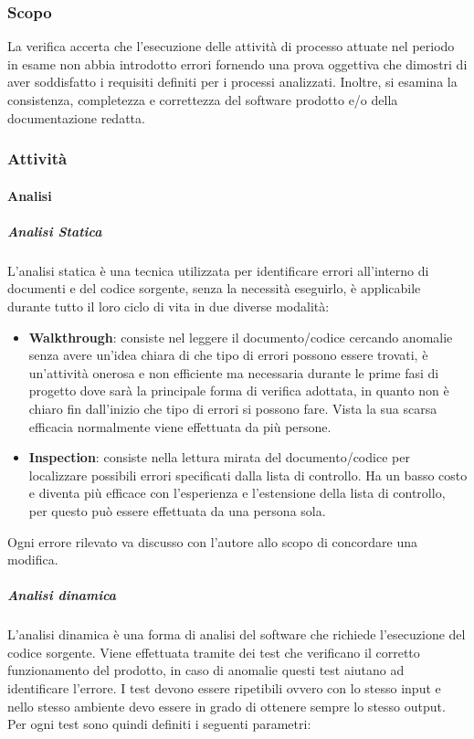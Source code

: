 \subsubsection{Scopo}
La verifica accerta che l'esecuzione delle attività di processo attuate nel periodo in esame non abbia introdotto errori fornendo una prova oggettiva che dimostri di aver soddisfatto i requisiti definiti per i processi analizzati.
Inoltre, si esamina la consistenza, completezza e correttezza del software prodotto e/o della documentazione redatta.
\subsubsection{Attività}
\paragraph{Analisi}
\subparagraph{Analisi Statica} \Spazio
L'analisi statica è una tecnica utilizzata per identificare errori all'interno di documenti e del codice sorgente, senza la necessità eseguirlo, è applicabile durante tutto il loro ciclo di vita in due diverse modalità:
\begin{itemize}
	\item \textbf{Walkthrough}:
	      consiste nel leggere il documento/codice cercando anomalie senza avere un'idea chiara di che tipo di errori possono essere trovati, è un'attività onerosa e non efficiente ma necessaria durante le prime fasi di progetto dove sarà la principale forma di verifica adottata, in quanto non è chiaro fin dall'inizio che tipo di errori si possono fare.
	      Vista la sua scarsa efficacia normalmente viene effettuata da più persone.
	\item \textbf{Inspection}:
	      consiste nella lettura mirata del documento/codice per localizzare possibili errori specificati dalla lista di controllo. Ha un basso costo e diventa più efficace con l'esperienza e l'estensione della lista di controllo, per questo può essere effettuata da una persona sola.
\end{itemize}
Ogni errore rilevato va discusso con l'autore allo scopo di concordare una modifica.
\subparagraph{Analisi dinamica} \Spazio
L'analisi dinamica è una forma di analisi del software che richiede l'esecuzione del codice sorgente. Viene effettuata tramite dei test che verificano il corretto funzionamento del prodotto, in caso di anomalie questi test aiutano ad identificare l'errore.
I test devono essere ripetibili ovvero con lo stesso input e nello stesso ambiente devo essere in grado di ottenere sempre lo stesso output. Per ogni test sono quindi definiti i seguenti parametri:
